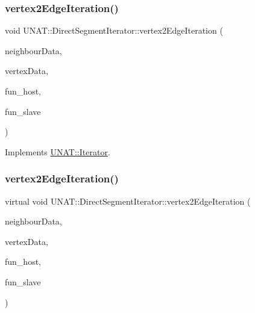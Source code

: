 \subsubsection{\texorpdfstring{vertex2EdgeIteration()}{vertex2EdgeIteration()}\hspace{0.1cm}{\footnotesize\ttfamily [1/2]}}
{\footnotesize\ttfamily void U\+N\+A\+T\+::\+Direct\+Segment\+Iterator\+::vertex2\+Edge\+Iteration (\begin{DoxyParamCaption}\item[{\mbox{\hyperlink{structArrays}{Arrays}} $\ast$}]{neighbour\+Data,  }\item[{\mbox{\hyperlink{structArrays}{Arrays}} $\ast$}]{vertex\+Data,  }\item[{\mbox{\hyperlink{test_2directSegment_2iterator_8h_a15a4eedea7b94460153f0a0924c98224}{v2e\+\_\+host\+Fun\+Ptr}}}]{fun\+\_\+host,  }\item[{\mbox{\hyperlink{test_2directSegment_2iterator_8h_acd8809485e3b16adfce1d459f3372671}{v2e\+\_\+slave\+Fun\+Ptr}}}]{fun\+\_\+slave }\end{DoxyParamCaption})\hspace{0.3cm}{\ttfamily [virtual]}}



Implements \mbox{\hyperlink{classUNAT_1_1Iterator_a0bb9f9c408c19b3c6bb342d37b333a1c}{U\+N\+A\+T\+::\+Iterator}}.

\mbox{\label{classUNAT_1_1DirectSegmentIterator_ac802bc1237356604a14c3349d6bf8d29}} 
\subsubsection{\texorpdfstring{vertex2EdgeIteration()}{vertex2EdgeIteration()}\hspace{0.1cm}{\footnotesize\ttfamily [2/2]}}
{\footnotesize\ttfamily virtual void U\+N\+A\+T\+::\+Direct\+Segment\+Iterator\+::vertex2\+Edge\+Iteration (\begin{DoxyParamCaption}\item[{\mbox{\hyperlink{structArrays}{Arrays}} $\ast$}]{neighbour\+Data,  }\item[{\mbox{\hyperlink{structArrays}{Arrays}} $\ast$}]{vertex\+Data,  }\item[{\mbox{\hyperlink{test_2directSegment_2iterator_8h_a15a4eedea7b94460153f0a0924c98224}{v2e\+\_\+host\+Fun\+Ptr}}}]{fun\+\_\+host,  }\item[{\mbox{\hyperlink{test_2directSegment_2iterator_8h_acd8809485e3b16adfce1d459f3372671}{v2e\+\_\+slave\+Fun\+Ptr}}}]{fun\+\_\+slave }\end{DoxyParamCaption})\hspace{0.3cm}{\ttfamily [virtual]}}



